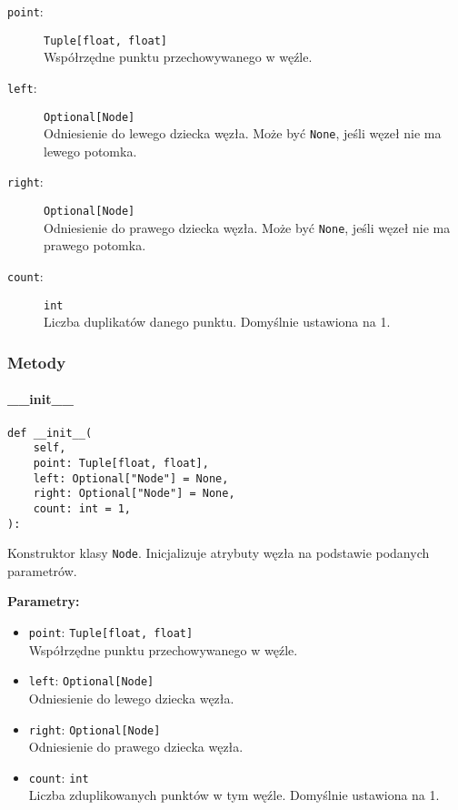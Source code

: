 \documentclass[12pt]{article}
\begin{document}
\begin{description}
    \item[\texttt{point}:] \texttt{Tuple[float, float]} \\
    Współrzędne punktu przechowywanego w węźle.
    
    \item[\texttt{left}:] \texttt{Optional[Node]} \\
    Odniesienie do lewego dziecka węzła. Może być \texttt{None}, jeśli węzeł nie ma lewego potomka.
    
    \item[\texttt{right}:] \texttt{Optional[Node]} \\
    Odniesienie do prawego dziecka węzła. Może być \texttt{None}, jeśli węzeł nie ma prawego potomka.
    
    \item[\texttt{count}:] \texttt{int} \\
    Liczba duplikatów danego punktu. Domyślnie ustawiona na 1.
\end{description}

\subsubsection{Metody}

\paragraph{\_\_init\_\_}

\begin{verbatim}
def __init__(
    self,
    point: Tuple[float, float],
    left: Optional["Node"] = None,
    right: Optional["Node"] = None,
    count: int = 1,
):
\end{verbatim}

\noindent Konstruktor klasy \texttt{Node}. Inicjalizuje atrybuty węzła na podstawie podanych parametrów.

\noindent\textbf{Parametry:}
\begin{itemize}
    \item \texttt{point}: \texttt{Tuple[float, float]} \\
    Współrzędne punktu przechowywanego w węźle.
    
    \item \texttt{left}: \texttt{Optional[Node]} \\
    Odniesienie do lewego dziecka węzła.
    
    \item \texttt{right}: \texttt{Optional[Node]} \\
    Odniesienie do prawego dziecka węzła.
    
    \item \texttt{count}: \texttt{int} \\
    Liczba zduplikowanych punktów w tym węźle. Domyślnie ustawiona na 1.
\end{itemize}
\end{document}
